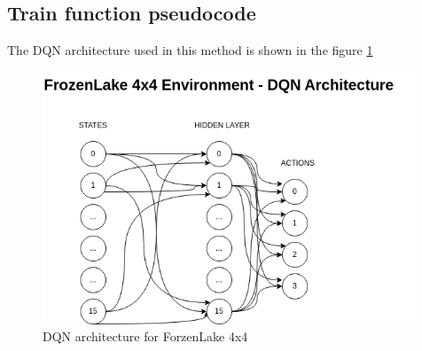 \subsection{Train function pseudocode}
The DQN architecture used in this method is shown in the figure \ref{fig:dqn_architecture}
\begin{figure}[H]
    \centering
    \includegraphics[width=0.99\textwidth]{images/dqn_architecture.drawio.png}
    \caption{DQN architecture for ForzenLake 4x4}
    \label{fig:dqn_architecture}
\end{figure}

